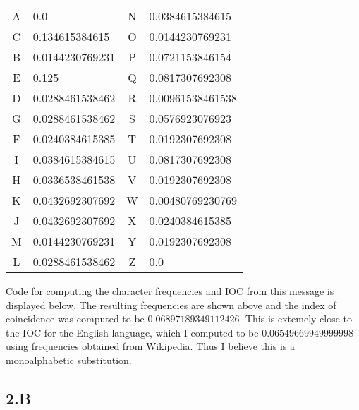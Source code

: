 \documentclass[12pt]{article}
\begin{document}
\begin{table}[h!]
  \centering
  \small
  \begin{tabular}{c|l|c|l}
A & 0.0 & N & 0.0384615384615\\
C & 0.134615384615 & O & 0.0144230769231 \\
B & 0.0144230769231&P & 0.0721153846154 \\
E & 0.125&Q & 0.0817307692308 \\
D & 0.0288461538462 &R & 0.00961538461538\\
G & 0.0288461538462 &S & 0.0576923076923\\
F & 0.0240384615385 &T & 0.0192307692308\\
I & 0.0384615384615 &U & 0.0817307692308\\
H & 0.0336538461538 &V & 0.0192307692308\\
K & 0.0432692307692 &W & 0.00480769230769\\
J & 0.0432692307692 &X & 0.0240384615385 \\
M & 0.0144230769231 &Y & 0.0192307692308\\
L & 0.0288461538462 &Z & 0.0\\
\end{tabular}
\end{table}

Code for computing the character frequencies and IOC from this message is displayed below. 
The resulting frequencies are shown above and the 
index of coincidence was computed to be $0.06897189349112426$. This is extemely close to the IOC for the English language, which I computed to be 
$0.06549669949999998$ using frequencies obtained from Wikipedia. Thus I believe this is a monoalphabetic substitution.

\subsection*{2.B}

\newpage
\end{document}
